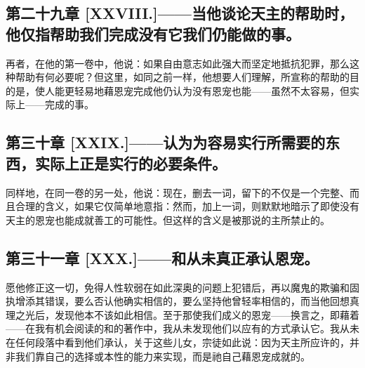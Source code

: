 
\subsection{第二十九章 [XXVIII.]——当他谈论天主的帮助时，他仅指帮助我们完成没有它我们仍能做的事。}

再者，在他的第一卷中，他说：如果自由意志如此强大而坚定地抵抗犯罪，那么这种帮助有何必要呢？但这里，如同之前一样，他想要人们理解，所宣称的帮助的目的是，使人能更轻易地藉恩宠完成他仍认为没有恩宠也能——虽然不太容易，但实际上——完成的事。\par


\subsection{第三十章 [XXIX.]——认为为容易实行所需要的东西，实际上正是实行的必要条件。}

同样地，在同一卷的另一处，他说：现在，删去一词，留下的不仅是一个完整、而且合理的含义，如果它仅简单地意指：然而，加上一词，则默默地暗示了即使没有天主的恩宠也能成就善工的可能性。但这样的含义是被那说的主所禁止的。\par


\subsection{第三十一章 [XXX.]——和从未真正承认恩宠。}

愿他修正这一切，免得人性软弱在如此深奥的问题上犯错后，再以魔鬼的欺骗和固执增添其错误，要么否认他确实相信的，要么坚持他曾轻率相信的，而当他回想真理之光后，发现他本不该如此相信。至于那使我们成义的恩宠——换言之，即藉着——在我有机会阅读的和的著作中，我从未发现他们以应有的方式承认它。我从未在任何段落中看到他们承认，关于这些儿女，宗徒如此说：因为天主所应许的，并非我们靠自己的选择或本性的能力来实现，而是祂自己藉恩宠成就的。\par

